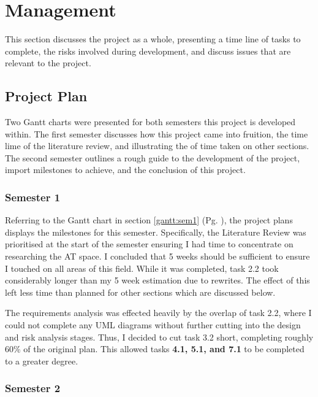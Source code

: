 %
\chapter{Management}
\label{sec:management}

This section discusses the project as a whole, presenting a time line of tasks to complete, the risks involved during development, and discuss issues that are relevant to the project.



\section{Project Plan}
\label{sec:management:pp}

Two Gantt charts were presented for both semesters this project is developed within. The first semester discusses how this project came into fruition, the time lime of the literature review, and illustrating the of time taken on other sections. The second semester outlines a rough guide to the development of the project, import milestones to achieve, and the conclusion of this project.

\subsection{Semester 1}
\label{sec:management:pp:sem1}

\noindent Referring to the Gantt chart in section \ref{gantt:sem1} (Pg. \pageref{gantt:sem1}), the project plans displays the milestones for this semester. Specifically, the Literature Review was prioritised at the start of the semester ensuring I had time to concentrate on researching the AT space. I concluded that 5 weeks should be sufficient to ensure I touched on all areas of this field. While it was completed, task 2.2 took considerably longer than my 5 week estimation due to rewrites. The effect of this left less time than planned for other sections which are discussed below.

The requirements analysis was effected heavily by the overlap of task 2.2, where I could not complete any UML diagrams without further cutting into the design and risk analysis stages. Thus, I decided to cut task 3.2 short, completing roughly 60\% of the original plan. This allowed tasks \textbf{4.1, 5.1, and 7.1} to be completed to a greater degree.



\subsection{Semester 2}
\label{sec:management:pp:sem2}

